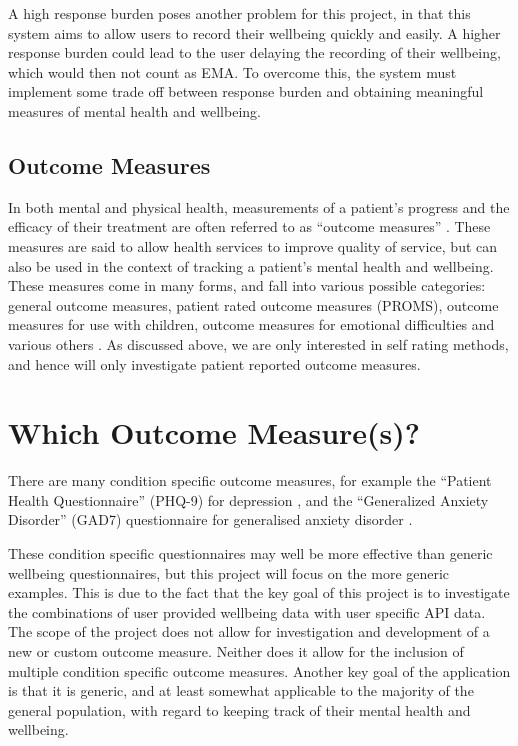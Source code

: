 \documentclass[11pt,openright,a4paper]{report}
\begin{document}
A high response burden poses another problem for this project, in that this system aims to allow users to record their wellbeing quickly and easily. A higher response burden could lead to the user delaying the recording of their wellbeing, which would then not count as EMA. To overcome this, the system must implement some trade off between response burden and obtaining meaningful measures of mental health and wellbeing.

\subsection{Outcome Measures}
In both mental and physical health, measurements of a patient's progress and the efficacy of their treatment are often referred to as \enquote{outcome measures} \parencite{pediaoutcomemeasures}. These measures are said to allow health services to improve quality of service, but can also be used in the context of tracking a patient's mental health and wellbeing. These measures come in many forms, and fall into various possible categories: general outcome measures, patient rated outcome measures (PROMS), outcome measures for use with children, outcome measures for emotional difficulties and various others \parencite{mhpoutcomemeasures}. As discussed above, we are only interested in self rating methods, and hence will only investigate patient reported outcome measures.

\section{Which Outcome Measure(s)?} \label{whichoutcomemeasures}
There are many condition specific outcome measures, for example the \enquote{Patient Health Questionnaire} (PHQ-9) for depression \parencite{kroenke2001phq}, and the \enquote{Generalized Anxiety Disorder} (GAD7) questionnaire for generalised anxiety disorder \parencite{spitzer2006brief}.

These condition specific questionnaires may well be more effective than generic wellbeing questionnaires, but this project will focus on the more generic examples. This is due to the fact that the key goal of this project is to investigate the combinations of user provided wellbeing data with user specific API data. The scope of the project does not allow for investigation and development of a new or custom outcome measure. Neither does it allow for the inclusion of multiple condition specific outcome measures. Another key goal of the application is that it is generic, and at least somewhat applicable to the majority of the general population, with regard to keeping track of their mental health and wellbeing.
\end{document}
